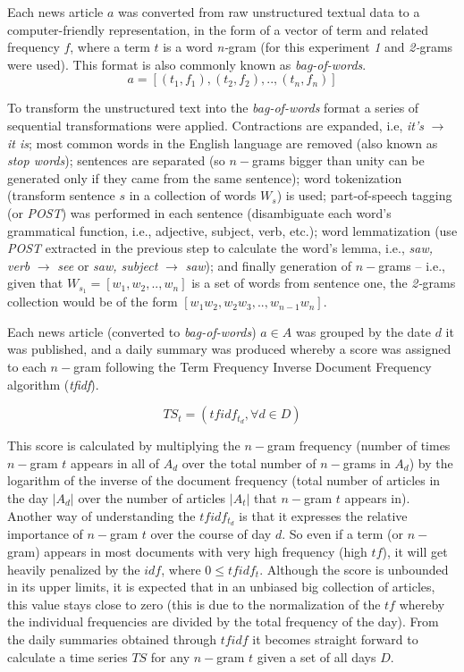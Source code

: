 \documentclass[conference,11pt]{IEEEtran}
\begin{document}
\par
Each news article \(a\) was converted from raw unstructured textual data to a computer-friendly representation, in the form of a vector of term and related frequency \(f\), where a term \(t\) is a word \textit{n-}gram (for this experiment \textit{1} and \textit{2-}grams were used). This format is also commonly known as \textit{bag-of-words}.
\[a=[(t_1,f_1),(t_2,f_2),..,(t_n,f_n)]\]

\par
To transform the unstructured text into the \textit{bag-of-words} format a series of sequential transformations were applied. Contractions are expanded, i.e, \textit{it's} \(\to\) \textit{it is}; most common words in the English language are removed (also known as \textit{stop words}); sentences are separated (so \(n-\)grams bigger than unity can be generated only if they came from the same sentence); word tokenization (transform sentence \(s\) in a collection of words \(W_s\)) is used; part-of-speech tagging (or \textit{POST}) was performed in each sentence (disambiguate each word's grammatical function, i.e., adjective, subject, verb, etc.); word lemmatization (use \textit{POST} extracted in the previous step to calculate the word's lemma, i.e., \textit{saw, verb} \(\to\) \textit{see} or \textit{saw, subject} \(\to\) \textit{saw}); and finally generation of \(n-\)grams -- i.e., given that \(W_{s_1}=[w_1,w_2,..,w_n]\) is a set of words from sentence one, the \textit{2-}grams collection would be of the form \([w_1 w_2,w_2 w_3,..,w_{n-1} w_n]\).

\par
Each news article (converted to \textit{bag-of-words}) \(a \in A\) was grouped by the date \(d\) it was published, and a daily summary was produced whereby a score was assigned to each \(n-\)gram following the Term Frequency Inverse Document Frequency algorithm (\textit{tfidf}).

\[TS_t=({tfidf_{t_d}}, \forall d \in D)\]

This score is calculated by multiplying the \(n-\)gram frequency (number of times \(n-\)gram \(t\) appears in all of \(A_d\) over the total number of \(n-\)grams in \(A_d\)) by the logarithm of the inverse of the document frequency (total number of articles in the day \(\vert A_d \vert\) over the number of articles \(\vert A_t \vert\) that \(n-\)gram \(t\) appears in). Another way of understanding the \(tfidf_{t_d}\) is that it expresses the relative importance of \(n-\)gram \(t\) over the course of day \(d\). So even if a term (or \(n-\)gram) appears in most documents with very high frequency (high \(tf\)), it will get heavily penalized by the \(idf\), where \(0 \leq tfidf_t\). Although the score is unbounded in its upper limits, it is expected that in an unbiased big collection of articles, this value stays close to zero (this is due to the normalization of the \(tf\) whereby the individual frequencies are divided by the total frequency of the day).
From the daily summaries obtained through \(tfidf\) it becomes straight forward to calculate a time series \(TS\) for any \(n-\)gram \(t\) given a set of all days \(D\).
\end{document}
